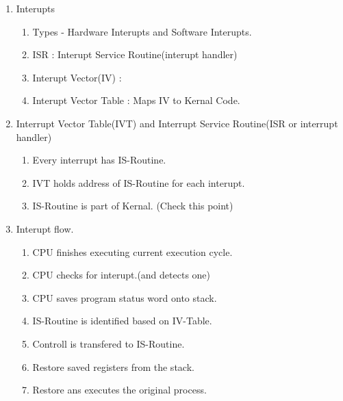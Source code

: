 \begin{enumerate}
  \item Interupts
  \begin{enumerate}
        \item Types - Hardware Interupts and Software Interupts.
        \item ISR : Interupt Service Routine(interupt handler)
        \item Interupt Vector(IV) :
        \item Interupt Vector Table : Maps IV to Kernal Code.
  \end{enumerate}

  \item Interrupt Vector Table(IVT) and Interrupt Service Routine(ISR or interrupt handler)
  \begin{enumerate}
        \item Every interrupt has IS-Routine.
        \item IVT holds address of IS-Routine for each interupt.
        \item IS-Routine is part of Kernal. (Check this point)
  \end{enumerate}

  \item Interupt flow.
  \begin{enumerate}
        \item CPU finishes executing current execution cycle.
        \item CPU checks for interupt.(and detects one)
        \item CPU saves program status word onto stack.
        \item IS-Routine is identified based on IV-Table.
        \item Controll is transfered to IS-Routine.
        \item Restore saved registers from the stack.
        \item Restore ans executes the original process.
  \end{enumerate}


\end{enumerate}








